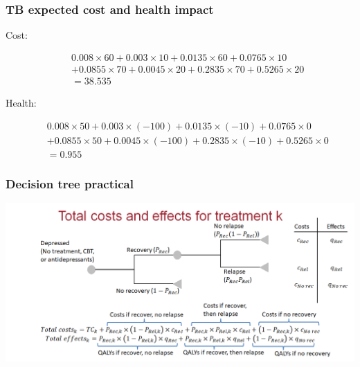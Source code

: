 \begin{frame}
\frametitle{TB expected cost and health impact}

Cost:

\begin{eqnarray*}
&& 0.008 \times 60 + 0.003 \times 10 + 0.0135 \times 60 + 0.0765 \times 10\\
&& + 0.0855 \times 70 + 0.0045 \times 20 + 0.2835 \times 70 + 0.5265 \times 20\\
&& = 38.535
\end{eqnarray*}

Health:

\begin{eqnarray*}
&& 0.008 \times 50 + 0.003 \times (-100) + 0.0135 \times (-10) + 0.0765 \times 0\\
&&  + 0.0855 \times 50 + 0.0045 \times (-100) + 0.2835 \times (-10) + 0.5265 \times 0\\
&& = 0.955
\end{eqnarray*}

\end{frame}

\begin{frame}
\frametitle{Decision tree practical}
 \includegraphics[width=\textwidth,height=0.8\textheight, keepaspectratio]{decision-trees/figs/practical-decision-tree}
\end{frame}



